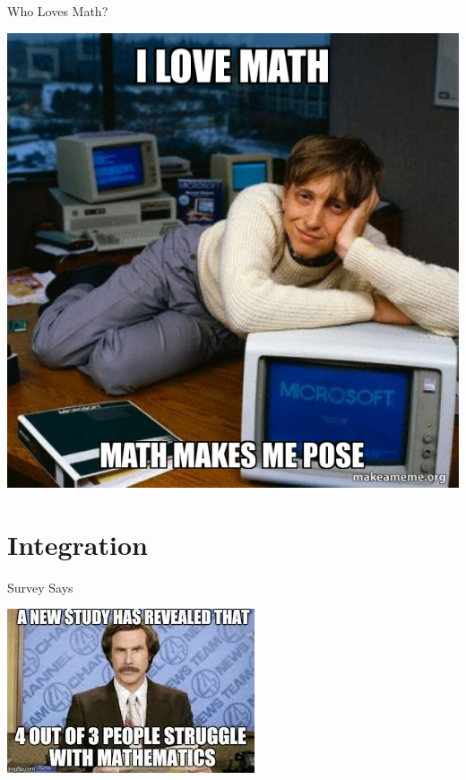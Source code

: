 \documentclass[t]{beamer}
\begin{document}
\begin{frame}{Who Loves Math?}
	\begin{center}
		\includegraphics[scale=0.45]{assets/i-love-math-7791d09576}
	\end{center}
\end{frame}

\section{Integration}
\begin{frame}{Survey Says}
	\begin{center}
		\includegraphics[scale=0.7]{assets/4-out-of-3-math}
	\end{center}
\end{frame}
\end{document}
